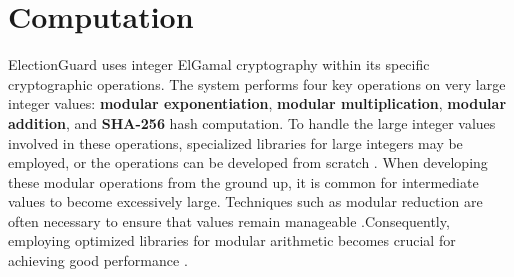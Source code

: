 \section{Computation}
ElectionGuard uses integer ElGamal cryptography within its specific cryptographic operations. The system performs four key operations on very large integer values: \textbf{modular exponentiation}, \textbf{modular multiplication}, \textbf{modular addition}, and \textbf{SHA-256} hash computation. To handle the large integer values involved in these operations, specialized libraries for large integers may be employed, or the operations can be developed from scratch \cite[21, 25-26]{eg-spec}. When developing these modular operations from the ground up, it is common for intermediate values to become excessively large. Techniques such as modular reduction are often necessary to ensure that values remain manageable \cite[21, 25-26]{eg-spec}.Consequently, employing optimized libraries for modular arithmetic becomes crucial for achieving good performance \cite[22]{eg-paper}.

